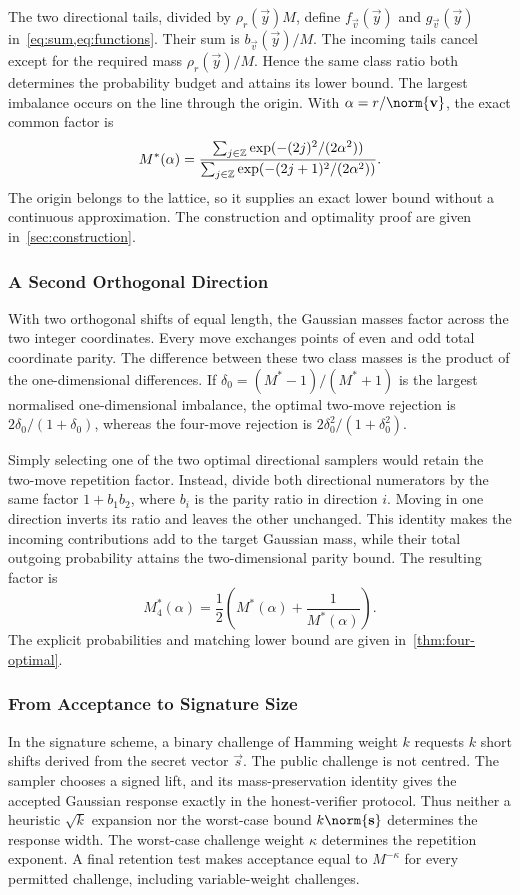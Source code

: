 The two directional tails, divided by $\rho_r(\vec y)M$, define $f_{\vec v}(\vec y)$ and $g_{\vec v}(\vec y)$ in~\cref{eq:sum,eq:functions}. Their sum is $b_{\vec v}(\vec y)/M$. The incoming tails cancel except for the required mass $\rho_r(\vec y)/M$. Hence the same class ratio both determines the probability budget and attains its lower bound. The largest imbalance occurs on the line through the origin. With $\alpha=r/\norm{\vec v}$, the exact common factor is
\[
 M^*(\alpha)=
 \frac{\sum_{j\in\mathbb{Z}}\exp(-(2j)^2/(2\alpha^2))}
 {\sum_{j\in\mathbb{Z}}\exp(-(2j+1)^2/(2\alpha^2))}.
\]
The origin belongs to the lattice, so it supplies an exact lower bound without a continuous approximation. The construction and optimality proof are given in~\cref{sec:construction}.

\subsubsection{A Second Orthogonal Direction}

With two orthogonal shifts of equal length, the Gaussian masses factor across the two integer coordinates. Every move exchanges points of even and odd total coordinate parity. The difference between these two class masses is the product of the one-dimensional differences. If $\delta_0=(M^*-1)/(M^*+1)$ is the largest normalised one-dimensional imbalance, the optimal two-move rejection is $2\delta_0/(1+\delta_0)$, whereas the four-move rejection is $2\delta_0^2/(1+\delta_0^2)$.

Simply selecting one of the two optimal directional samplers would retain the two-move repetition factor. Instead, divide both directional numerators by the same factor $1+b_1b_2$, where $b_i$ is the parity ratio in direction $i$. Moving in one direction inverts its ratio and leaves the other unchanged. This identity makes the incoming contributions add to the target Gaussian mass, while their total outgoing probability attains the two-dimensional parity bound. The resulting factor is
\[
 M_4^*(\alpha)=\frac12\left(M^*(\alpha)+\frac1{M^*(\alpha)}\right).
\]
The explicit probabilities and matching lower bound are given in~\cref{thm:four-optimal}.

\subsubsection{From Acceptance to Signature Size}

In the signature scheme, a binary challenge of Hamming weight $k$ requests $k$ short shifts derived from the secret vector $\vec s$. The public challenge is not centred. The sampler chooses a signed lift, and its mass-preservation identity gives the accepted Gaussian response exactly in the honest-verifier protocol. Thus neither a heuristic $\sqrt{k}$ expansion nor the worst-case bound $k\norm{\vec s}$ determines the response width. The worst-case challenge weight $\kappa$ determines the repetition exponent. A final retention test makes acceptance equal to $M^{-\kappa}$ for every permitted challenge, including variable-weight challenges.

